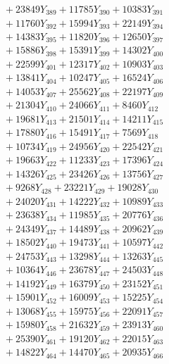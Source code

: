 \documentclass[a4paper,10pt]{article}
\begin{document}
{\begin{align}
&\;  + 23849 Y_{389} + 11785 Y_{390} + 10383 Y_{391} \\[0.3ex]
&\;  + 11760 Y_{392} + 15994 Y_{393} + 22149 Y_{394} \\[0.3ex]
&\;  + 14383 Y_{395} + 11820 Y_{396} + 12650 Y_{397} \\[0.3ex]
&\;  + 15886 Y_{398} + 15391 Y_{399} + 14302 Y_{400} \\[0.3ex]
&\;  + 22599 Y_{401} + 12317 Y_{402} + 10903 Y_{403} \\[0.3ex]
&\;  + 13841 Y_{404} + 10247 Y_{405} + 16524 Y_{406} \\[0.3ex]
&\;  + 14053 Y_{407} + 25562 Y_{408} + 22197 Y_{409} \\[0.3ex]
&\;  + 21304 Y_{410} + 24066 Y_{411} + 8460 Y_{412} \\[0.3ex]
&\;  + 19681 Y_{413} + 21501 Y_{414} + 14211 Y_{415} \\[0.3ex]
&\;  + 17880 Y_{416} + 15491 Y_{417} + 7569 Y_{418} \\[0.5ex]\allowbreak
&\;  + 10734 Y_{419} + 24956 Y_{420} + 22542 Y_{421} \\[0.3ex]
&\;  + 19663 Y_{422} + 11233 Y_{423} + 17396 Y_{424} \\[0.3ex]
&\;  + 14326 Y_{425} + 23426 Y_{426} + 13756 Y_{427} \\[0.3ex]
&\;  + 9268 Y_{428} + 23221 Y_{429} + 19028 Y_{430} \\[0.3ex]
&\;  + 24020 Y_{431} + 14222 Y_{432} + 10989 Y_{433} \\[0.3ex]
&\;  + 23638 Y_{434} + 11985 Y_{435} + 20776 Y_{436} \\[0.3ex]
&\;  + 24349 Y_{437} + 14489 Y_{438} + 20962 Y_{439} \\[0.3ex]
&\;  + 18502 Y_{440} + 19473 Y_{441} + 10597 Y_{442} \\[0.3ex]
&\;  + 24753 Y_{443} + 13298 Y_{444} + 13263 Y_{445} \\[0.3ex]
&\;  + 10364 Y_{446} + 23678 Y_{447} + 24503 Y_{448} \\[0.5ex]\allowbreak
&\;  + 14192 Y_{449} + 16379 Y_{450} + 23152 Y_{451} \\[0.3ex]
&\;  + 15901 Y_{452} + 16009 Y_{453} + 15225 Y_{454} \\[0.3ex]
&\;  + 13068 Y_{455} + 15975 Y_{456} + 22091 Y_{457} \\[0.3ex]
&\;  + 15980 Y_{458} + 21632 Y_{459} + 23913 Y_{460} \\[0.3ex]
&\;  + 25390 Y_{461} + 19120 Y_{462} + 22015 Y_{463} \\[0.3ex]
&\;  + 14822 Y_{464} + 14470 Y_{465} + 20935 Y_{466} \\[0.3ex]

\end{align}}
\end{document}
